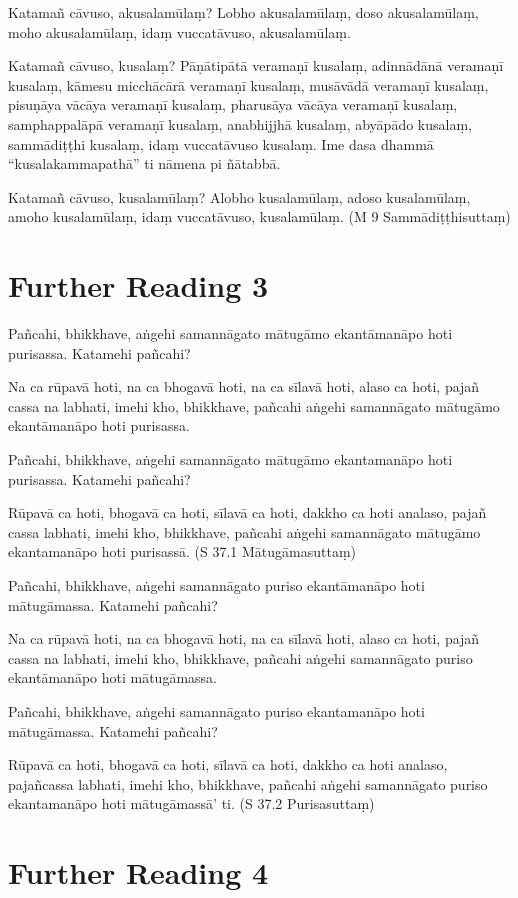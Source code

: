 Katamañ cāvuso, akusalamūlaṃ? Lobho akusalamūlaṃ, doso akusalamūlaṃ, moho akusalamūlaṃ, idaṃ vuccatāvuso, akusalamūlaṃ.

Katamañ cāvuso, kusalaṃ? Pāṇātipātā veramaṇī kusalaṃ, adinnādānā veramaṇī kusalaṃ, kāmesu micchācārā veramaṇī kusalaṃ, musāvādā veramaṇī kusalaṃ, pisuṇāya vācāya veramaṇī kusalaṃ, pharusāya vācāya veramaṇī kusalaṃ, samphappalāpā veramaṇī kusalaṃ, anabhijjhā kusalaṃ, abyāpādo kusalaṃ, sammādiṭṭhi kusalaṃ, idaṃ vuccatāvuso kusalaṃ. Ime dasa dhammā “kusalakammapathā” ti nāmena pi ñātabbā.

Katamañ cāvuso, kusalamūlaṃ? Alobho kusalamūlaṃ, adoso kusalamūlaṃ, amoho kusalamūlaṃ, idaṃ vuccatāvuso, kusalamūlaṃ. \hfill(M 9 Sammādiṭṭhisuttaṃ)

\section*{Further Reading 3}

Pañcahi, bhikkhave, aṅgehi samannāgato mātugāmo ekantāmanāpo hoti purisassa. Katamehi pañcahi?

Na ca rūpavā hoti, na ca bhogavā hoti, na ca sīlavā hoti, alaso ca hoti, pajañ cassa na labhati, imehi kho, bhikkhave, pañcahi aṅgehi samannāgato mātugāmo ekantāmanāpo hoti purisassa.

Pañcahi, bhikkhave, aṅgehi samannāgato mātugāmo ekantamanāpo hoti purisassa. Katamehi pañcahi?

Rūpavā ca hoti, bhogavā ca hoti, sīlavā ca hoti, dakkho ca hoti analaso, pajañ cassa labhati, imehi kho, bhikkhave, pañcahi aṅgehi samannāgato mātugāmo ekantamanāpo hoti purisassā. \hfill(S 37.1 Mātugāmasuttaṃ)

Pañcahi, bhikkhave, aṅgehi samannāgato puriso ekantāmanāpo hoti mātugāmassa. Katamehi pañcahi?

Na ca rūpavā hoti, na ca bhogavā hoti, na ca sīlavā hoti, alaso ca hoti, pajañ cassa na labhati, imehi kho, bhikkhave, pañcahi aṅgehi samannāgato puriso ekantāmanāpo hoti mātugāmassa.

Pañcahi, bhikkhave, aṅgehi samannāgato puriso ekantamanāpo hoti mātugāmassa. Katamehi pañcahi?

Rūpavā ca hoti, bhogavā ca hoti, sīlavā ca hoti, dakkho ca hoti analaso, pajañcassa labhati, imehi kho, bhikkhave, pañcahi aṅgehi samannāgato puriso ekantamanāpo hoti mātugāmassā’ ti. \hfill(S 37.2 Purisasuttaṃ)

\section*{Further Reading 4}

